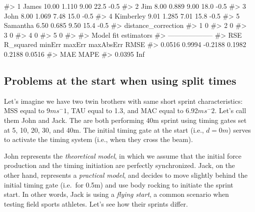 \documentclass[
]{jss}
\begin{document}
\begin{CodeChunk}
\begin{CodeOutput}
#> 1     James 10.00 1.110 9.00 22.5            -0.5
#> 2       Jim  8.00 0.889 9.00 18.0            -0.5
#> 3      John  8.00 1.069 7.48 15.0            -0.5
#> 4 Kimberley  9.01 1.285 7.01 15.8            -0.5
#> 5  Samantha  6.50 0.685 9.50 15.4            -0.5
#>   distance_correction
#> 1                   0
#> 2                   0
#> 3                   0
#> 4                   0
#> 5                   0
#> 
#> Model fit estimators
#> --------------------
#>       RSE R_squared    minErr    maxErr maxAbsErr      RMSE 
#>    0.0516    0.9994   -0.2188    0.1982    0.2188    0.0516 
#>       MAE      MAPE 
#>    0.0395       Inf
\end{CodeOutput}
\end{CodeChunk}

\hypertarget{problems-at-the-start-when-using-split-times}{%
\subsection{Problems at the start when using split times}\label{problems-at-the-start-when-using-split-times}}

Let's imagine we have two twin brothers with same short sprint characteristics: MSS equal to 9\(ms^-1\), TAU equal to 1.3, and MAC equal to 6.92\(ms^-2\). Let's call them John and Jack. The are both performing 40m sprint using timing gates set at 5, 10, 20, 30, and 40m. The initial timing gate at the start (i.e., \(d=0m\)) serves to activate the timing system (i.e., when they cross the beam).

John represents the \emph{theoretical model}, in which we assume that the initial force production and the timing initiation are perfectly synchronized. Jack, on the other hand, represents a \emph{practical model}, and decides to move slightly behind the initial timing gate (i.e.~for 0.5m) and use body rocking to initiate the sprint start. In other words, Jack is using a \emph{flying start}, a common scenario when testing field sports athletes. Let's see how their sprints differ.
\end{document}
